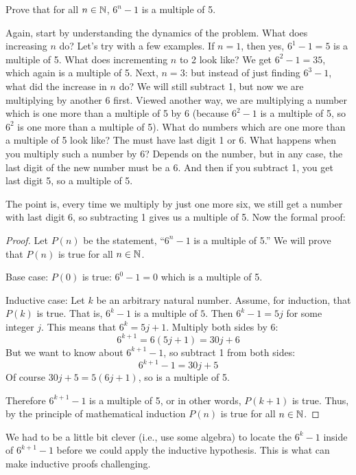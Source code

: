 \documentclass[12pt]{article}
\begin{document}
 \begin{example}
   Prove that for all $n \in \mathbb N$, $6^n - 1$ is a multiple of 5.
   \begin{solution}
   Again, start by understanding the dynamics of the problem.  What does increasing $n$ do?  Let's try with a few examples.  If $n = 1$, then yes, $6^1 - 1 = 5$ is a multiple of 5.  What does incrementing $n$ to 2 look like?  We get $6^2 - 1 = 35$, which again is a multiple of 5.  Next, $n = 3$: but instead of just finding $6^3 - 1$, what did the increase in $n$ do?  We will still subtract 1, but now we are multiplying by another 6 first.  Viewed another way, we are multiplying a number which is one more than a multiple of 5 by 6 (because $6^2 - 1$ is a multiple of 5, so $6^2$ is one more than a multiple of 5).  What do numbers which are one more than a multiple of 5 look like?  The must have last digit 1 or 6.  What happens when you multiply such a number by 6?  Depends on the number, but in any case, the last digit of the new number must be a 6.  And then if you subtract 1, you get last digit 5, so a multiple of 5.  
   
   The point is, every time we multiply by just one more six, we still get a number with last digit 6, so subtracting 1 gives us a multiple of 5. Now the formal proof:
   
   \begin{proof}
     Let $P(n)$ be the statement, ``$6^n - 1$ is a multiple of 5.''  We will prove that $P(n)$ is true for all $n \in \mathbb N$.
     
     Base case: $P(0)$ is true: $6^0 -1 = 0$ which is a multiple of 5.
     
     Inductive case: Let $k$ be an arbitrary natural number.  Assume, for induction, that $P(k)$ is true.  That is, $6^k - 1$ is a multiple of $5$.  Then $6^k - 1 = 5j$ for some integer $j$.  This means that $6^k = 5j + 1$.  Multiply both sides by $6$: 
     \[6^{k+1} = 6(5j+1) = 30j + 6\]
     But we want to know about $6^{k+1} - 1$, so subtract 1 from both sides:
     \[6^{k+1} - 1 = 30j + 5\]
     Of course $30j+5 = 5(6j+1)$, so is a multiple of 5.

     Therefore $6^{k+1} - 1$ is a multiple of 5, or in other words, $P(k+1)$ is true.  Thus, by the principle of mathematical induction $P(n)$ is true for all $n \in \mathbb N$.
   \end{proof}
   \end{solution}
 \end{example}

We had to be a little bit clever (i.e., use some algebra) to locate the $6^k - 1$ inside of $6^{k+1} - 1$ before we could apply the inductive hypothesis.  This is what can make inductive proofs challenging.  
\end{document}
